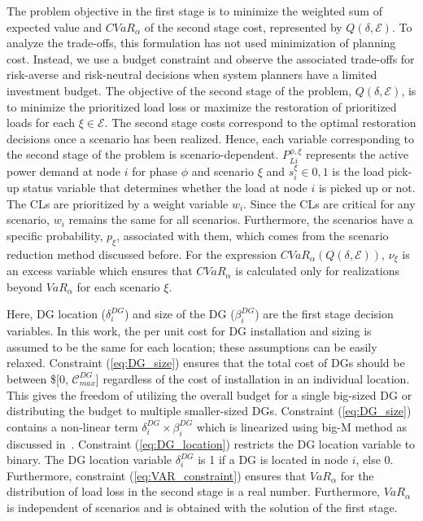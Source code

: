\documentclass[hidelinks, 12pt]{article}
\begin{document}
The problem objective in the first stage is to minimize the weighted sum of expected value and $CVaR_\alpha$ of the second stage cost, represented by $Q(\delta, \mathcal{E})$. To analyze the trade-offs, this formulation has not used minimization of planning cost. Instead, we use a budget constraint and observe the associated trade-offs for risk-averse and risk-neutral decisions when system planners have a limited investment budget. The objective of the second stage of the problem, $Q(\delta, \mathcal{E})$, is to minimize the prioritized load loss or maximize the restoration of prioritized loads for each $\xi \in \mathcal{E}$. The second stage costs correspond to the optimal restoration decisions once a scenario has been realized. Hence, each variable corresponding to the second stage of the problem is scenario-dependent. $P_{Li}^{\phi,\xi}$ represents the active power demand at node $i$ for phase $\phi$ and scenario $\xi$ and $s_i^\xi \in {0, 1}$ is the load pick-up status variable that determines whether the load at node $i$ is picked up or not. The CLs are prioritized by a weight variable $w_i$. Since the CLs are critical for any scenario, $w_i$ remains the same for all scenarios. Furthermore, the scenarios have a specific probability, $p_\xi$, associated with them, which comes from the scenario reduction method discussed before. For the expression $CVaR_\alpha(Q(\delta, \mathcal{E}))$, $\nu_\xi$ is an excess variable which ensures that $CVaR_\alpha$ is calculated only for realizations beyond $VaR_\alpha$ for each scenario $\xi$. 

Here, DG location ($\delta^{DG}_i$) and size of the DG ($\beta^{DG}_i$) are the first stage decision variables. In this work, the per unit cost for DG installation and sizing is assumed to be the same for each location; these assumptions can be easily relaxed.  
Constraint (\ref{eq:DG_size}) ensures that the total cost of DGs should be between \$[0, $\mathcal{C}^{DG}_{max}$] regardless of the cost of installation in an individual location. This gives the freedom of utilizing the overall budget for a single big-sized DG or distributing the budget to multiple smaller-sized DGs. Constraint (\ref{eq:DG_size}) contains a non-linear term $\delta_i^{DG} \times \beta^{DG}_i$ which is linearized using big-M method as discussed in~\cite{coelho2013linearization}. Constraint (\ref{eq:DG_location}) restricts the DG location variable to binary. The DG location variable $\delta^{DG}_i$ is 1 if a DG is located in node $i$, else 0. Furthermore, constraint (\ref{eq:VAR_constraint}) ensures that $VaR_\alpha$ for the distribution of load loss in the second stage is a real number. Furthermore, $VaR_\alpha$ is independent of scenarios and is obtained with the solution of the first stage. 
\end{document}

